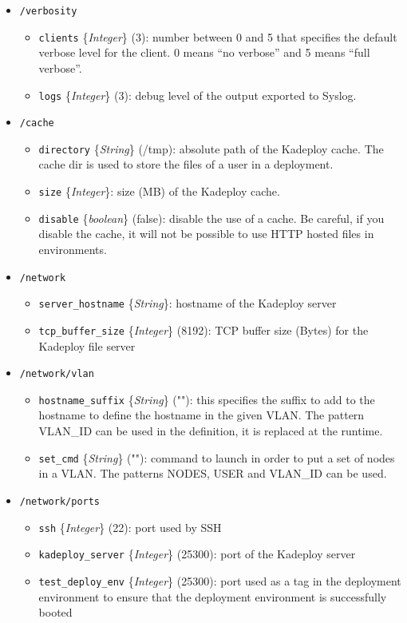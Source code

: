 \documentclass[a4wide,10pt,oneside]{book}
\newcommand{\ypath}[1]{\texttt{#1}}
\newcommand{\yfield}[2]{\texttt{#1} {\small\{{\emph{#2}}\}}:}
\newcommand{\yfieldd}[3]{\texttt{#1} {\small\{{\emph{#2}}\}} {\small(}#3{\small)}:}
\begin{document}
\begin{itemize}
  \item \ypath{/verbosity}
  \begin{itemize}
    \item \yfieldd{clients}{Integer}{3} number between 0 and 5 that specifies the default verbose level for the client. 0 means ``no verbose'' and 5 means ``full verbose''.
    \item \yfieldd{logs}{Integer}{3} debug level of the output exported to Syslog.
  \end{itemize}

  \item \ypath{/cache}
  \begin{itemize}
    \item \yfieldd{directory}{String}{/tmp} absolute path of the Kadeploy cache. The cache dir is used to store the files of a user in a deployment.
    \item \yfield{size}{Integer} size (MB) of the Kadeploy cache.
    \item \yfieldd{disable}{boolean}{false} disable the use of a cache. Be careful, if you disable the cache, it will not be possible to use HTTP hosted files in environments.
  \end{itemize}

  \item \ypath{/network}
  \begin{itemize}
    \item \yfield{server\_hostname}{String} hostname of the Kadeploy server
    \item \yfieldd{tcp\_buffer\_size}{Integer}{8192} TCP buffer size (Bytes) for the Kadeploy file server
  \end{itemize}

  \item \ypath{/network/vlan}
  \begin{itemize}
    \item \yfieldd{hostname\_suffix}{String}{""} this specifies the suffix to add to the hostname to define the hostname in the given VLAN. The pattern VLAN\_ID can be used in the definition, it is replaced at the runtime.
    \item \yfieldd{set\_cmd}{String}{""} command to launch in order to put a set of nodes in a VLAN. The patterns NODES, USER and VLAN\_ID can be used.
  \end{itemize}

  \item \ypath{/network/ports}
  \begin{itemize}
    \item \yfieldd{ssh}{Integer}{22} port used by SSH
    \item \yfieldd{kadeploy\_server}{Integer}{25300} port of the Kadeploy server
    \item \yfieldd{test\_deploy\_env}{Integer}{25300} port used as a tag in the deployment environment to ensure that the deployment environment is successfully booted
  \end{itemize}


\end{itemize}
\end{document}

